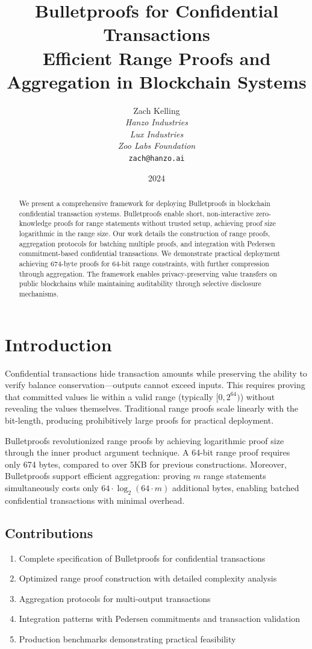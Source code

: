 \documentclass[11pt,a4paper]{article}
\title{Bulletproofs for Confidential Transactions\\
Efficient Range Proofs and Aggregation in Blockchain Systems}
\author{Zach Kelling\\
\textit{Hanzo Industries}\\
\textit{Lux Industries}\\
\textit{Zoo Labs Foundation}\\
\texttt{zach@hanzo.ai}}
\date{2024}
\begin{document}
\maketitle

\begin{abstract}
We present a comprehensive framework for deploying Bulletproofs in blockchain confidential transaction systems. Bulletproofs enable short, non-interactive zero-knowledge proofs for range statements without trusted setup, achieving proof size logarithmic in the range size. Our work details the construction of range proofs, aggregation protocols for batching multiple proofs, and integration with Pedersen commitment-based confidential transactions. We demonstrate practical deployment achieving 674-byte proofs for 64-bit range constraints, with further compression through aggregation. The framework enables privacy-preserving value transfers on public blockchains while maintaining auditability through selective disclosure mechanisms.
\end{abstract}

\section{Introduction}

Confidential transactions hide transaction amounts while preserving the ability to verify balance conservation---outputs cannot exceed inputs. This requires proving that committed values lie within a valid range (typically $[0, 2^{64})$) without revealing the values themselves. Traditional range proofs scale linearly with the bit-length, producing prohibitively large proofs for practical deployment.

Bulletproofs \cite{bulletproofs} revolutionized range proofs by achieving logarithmic proof size through the inner product argument technique. A 64-bit range proof requires only 674 bytes, compared to over 5KB for previous constructions. Moreover, Bulletproofs support efficient aggregation: proving $m$ range statements simultaneously costs only $64 \cdot \log_2(64 \cdot m)$ additional bytes, enabling batched confidential transactions with minimal overhead.

\subsection{Contributions}

\begin{enumerate}[label=(\roman*)]
    \item Complete specification of Bulletproofs for confidential transactions
    \item Optimized range proof construction with detailed complexity analysis
    \item Aggregation protocols for multi-output transactions
    \item Integration patterns with Pedersen commitments and transaction validation
    \item Production benchmarks demonstrating practical feasibility
\end{enumerate}
\end{document}
